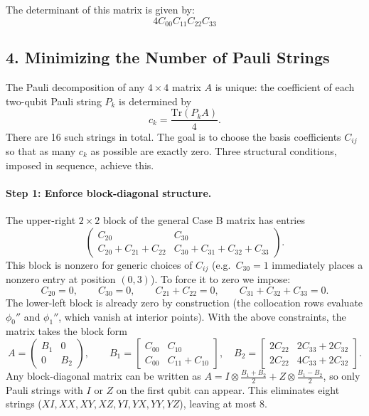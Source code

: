 \documentclass{article}
\begin{document}
The determinant of this matrix is given by:
\begin{equation}
4 C_{00} C_{11} C_{22} C_{33}
\end{equation}


\subsection*{4. Minimizing the Number of Pauli Strings}

The Pauli decomposition of any $4 \times 4$ matrix $A$ is unique: the coefficient of each
two-qubit Pauli string $P_k$ is determined by
\begin{equation}
    c_k = \frac{\mathrm{Tr}(P_k A)}{4}.
\end{equation}
There are 16 such strings in total.  The goal is to choose the basis coefficients $C_{ij}$
so that as many $c_k$ as possible are exactly zero.  Three structural conditions, imposed
in sequence, achieve this.

\paragraph{Step 1: Enforce block-diagonal structure.}
The upper-right $2\times 2$ block of the general Case B matrix has entries
\begin{equation}
    \begin{pmatrix} C_{20} & C_{30} \\ C_{20}+C_{21}+C_{22} & C_{30}+C_{31}+C_{32}+C_{33} \end{pmatrix}.
\end{equation}
This block is nonzero for generic choices of $C_{ij}$ (e.g.\ $C_{30}=1$ immediately
places a nonzero entry at position $(0,3)$).  To force it to zero we impose:
\begin{equation}
    C_{20} = 0, \qquad C_{30} = 0, \qquad C_{21} + C_{22} = 0, \qquad C_{31}+C_{32}+C_{33} = 0.
\end{equation}
The lower-left block is already zero by construction (the collocation rows evaluate
$\phi_0''$ and $\phi_1''$, which vanish at interior points).  With the above constraints,
the matrix takes the block form
\begin{equation}
    A = \begin{pmatrix} B_1 & 0 \\ 0 & B_2 \end{pmatrix}, \qquad
    B_1 = \begin{bmatrix} C_{00} & C_{10} \\ C_{00} & C_{11}+C_{10} \end{bmatrix}, \quad
    B_2 = \begin{bmatrix} 2C_{22} & 2C_{33}+2C_{32} \\ 2C_{22} & 4C_{33}+2C_{32} \end{bmatrix}.
\end{equation}
Any block-diagonal matrix can be written as
$A = I \otimes \tfrac{B_1+B_2}{2} + Z \otimes \tfrac{B_1-B_2}{2}$,
so only Pauli strings with $I$ or $Z$ on the first qubit can appear.
This eliminates eight strings ($XI, XX, XY, XZ, YI, YX, YY, YZ$), leaving at most 8.
\end{document}
